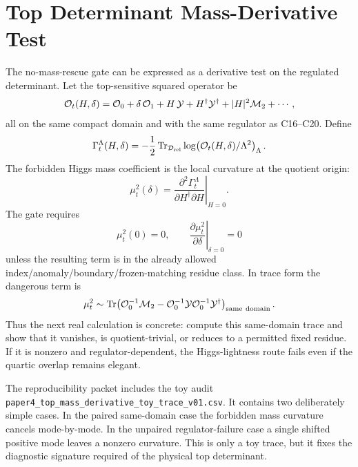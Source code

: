 \documentclass[11pt]{article}
\begin{document}
\section{Top Determinant Mass-Derivative Test}
The no-mass-rescue gate can be expressed as a derivative test on the regulated
determinant.  Let the top-sensitive squared operator be
\begin{equation}
{\cal O}_t(H,\delta)
=
{\cal O}_0+\delta\,{\cal O}_1+H\,{\cal Y}+H^\dagger{\cal Y}^\dagger
+|H|^2{\cal M}_2+\cdots ,
\end{equation}
all on the same compact domain and with the same regulator as C16--C20.  Define
\begin{equation}
\Gamma_t^\Lambda(H,\delta)
=-\frac12
\operatorname{Tr}_{\mathcal D_{\rm rel}}
\log\!\left({\cal O}_t(H,\delta)/\Lambda^2\right)_\Lambda .
\end{equation}
The forbidden Higgs mass coefficient is the local curvature at the quotient
origin:
\begin{equation}
\mu_t^2(\delta)
=
\left.
\frac{\partial^2\Gamma_t^\Lambda}{\partial H^\dagger\partial H}
\right|_{H=0} .
\end{equation}
The gate requires
\begin{equation}
\mu_t^2(0)=0,\qquad
\left.\frac{\partial\mu_t^2}{\partial\delta}\right|_{\delta=0}=0
\end{equation}
unless the resulting term is in the already allowed
index/anomaly/boundary/frozen-matching residue class.  In trace form the
dangerous term is
\begin{equation}
\mu_t^2
\sim
\operatorname{Tr}\!\left(
{\cal O}_0^{-1}{\cal M}_2
-{\cal O}_0^{-1}{\cal Y}{\cal O}_0^{-1}{\cal Y}^\dagger
\right)_{\rm same\ domain} .
\end{equation}
Thus the next real calculation is concrete: compute this same-domain trace and
show that it vanishes, is quotient-trivial, or reduces to a permitted fixed
residue.  If it is nonzero and regulator-dependent, the Higgs-lightness route
fails even if the quartic overlap remains elegant.

The reproducibility packet includes the toy audit
\texttt{paper4\_top\_mass\_derivative\_toy\_trace\_v01.csv}.  It contains
two deliberately simple cases.  In the paired same-domain case the forbidden
mass curvature cancels mode-by-mode.  In the unpaired regulator-failure case a
single shifted positive mode leaves a nonzero curvature.  This is only a toy
trace, but it fixes the diagnostic signature required of the physical top
determinant.
\end{document}
